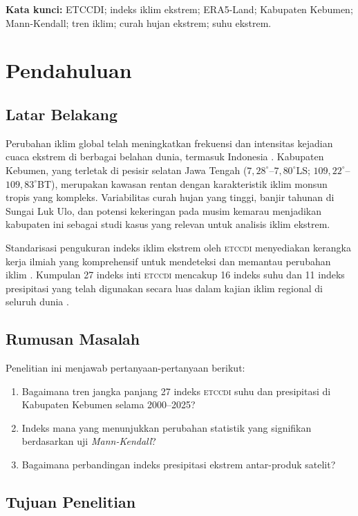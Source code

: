 \documentclass[12pt, a4paper]{article}
\newcommand{\etccdi}{\textsc{etccdi}}
\newcommand{\mk}{\textit{Mann-Kendall}}
\begin{document}
\textbf{Kata kunci:} ETCCDI; indeks iklim ekstrem; ERA5-Land; Kabupaten Kebumen; Mann-Kendall; tren iklim; curah hujan ekstrem; suhu ekstrem.

\newpage

\section{Pendahuluan}

\subsection{Latar Belakang}

Perubahan iklim global telah meningkatkan frekuensi dan intensitas kejadian cuaca ekstrem di berbagai belahan dunia, termasuk Indonesia \citep{ipcc2021}. Kabupaten Kebumen, yang terletak di pesisir selatan Jawa Tengah ($7{,}28^{\circ}$--$7{,}80^{\circ}$LS; $109{,}22^{\circ}$--$109{,}83^{\circ}$BT), merupakan kawasan rentan dengan karakteristik iklim monsun tropis yang kompleks. Variabilitas curah hujan yang tinggi, banjir tahunan di Sungai Luk Ulo, dan potensi kekeringan pada musim kemarau menjadikan kabupaten ini sebagai studi kasus yang relevan untuk analisis iklim ekstrem.

Standarisasi pengukuran indeks iklim ekstrem oleh \etccdi{} menyediakan kerangka kerja ilmiah yang komprehensif untuk mendeteksi dan memantau perubahan iklim \citep{alexander2006,zhang2011}. Kumpulan 27 indeks inti \etccdi{} mencakup 16 indeks suhu dan 11 indeks presipitasi yang telah digunakan secara luas dalam kajian iklim regional di seluruh dunia \citep{donat2013}.

\subsection{Rumusan Masalah}

Penelitian ini menjawab pertanyaan-pertanyaan berikut:
\begin{enumerate}
  \item Bagaimana tren jangka panjang 27 indeks \etccdi{} suhu dan presipitasi di Kabupaten Kebumen selama 2000--2025?
  \item Indeks mana yang menunjukkan perubahan statistik yang signifikan berdasarkan uji \mk{}?
  \item Bagaimana perbandingan indeks presipitasi ekstrem antar-produk satelit?
\end{enumerate}

\subsection{Tujuan Penelitian}
\end{document}
